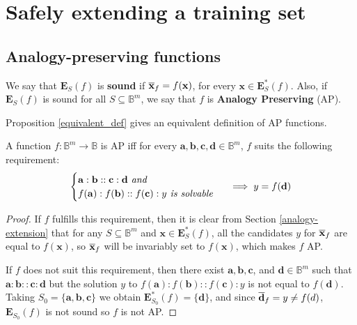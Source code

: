 \section{Safely extending a training set}
\subsection{Analogy-preserving functions}
\label{analogy-preserv}

\begin{definition}
  We say that $\mathbf{E}_S(f)$ is {\bf sound} if
  $\overline{\mathbf{x}}_f=f(\mathbf{x})$, for every $\mathbf{x} \in
  \mathbf{E}^*_S(f)$. Also, if $\mathbf{E}_S(f)$ is sound for all $S \subseteq
  \mathbb{B}^m$, we say that $f$ is {\bf Analogy Preserving} (AP).
\end{definition}

\noindent
Proposition \ref{equivalent_def} gives an equivalent definition of AP
functions.

\begin{proposition}\label{equivalent_def}
  A function $f \colon \mathbb{B}^m \to \mathbb{B}$ is AP iff for every
  $\mathbf{a}, \mathbf{b}, \mathbf{c}, \mathbf{d} \in \mathbb{B}^m$, $f$ suits
  the following requirement:
  $$
  \begin{cases}
    \mathbf{a} :  \mathbf{b} ::  \mathbf{c} :  \mathbf{d} \emph{ and }\\
  f(\mathbf{a}) :  f(\mathbf{b}) ::  f(\mathbf{c}) :  y \emph{ is solvable  }
  \end{cases}
  \implies y = f(\mathbf{d})
  $$
\end{proposition}
\begin{proof}
  If $f$ fulfills  this requirement, then it is clear from Section
  \ref{analogy-extension} that for any $S \subseteq
  \mathbb{B}^m$ and $\mathbf{x} \in \mathbf{E}^*_S(f)$, all the candidates $y$
  for $\overline{\mathbf{x}}_f$ are equal to $f(\mathbf{x})$, so
  $\overline{\mathbf{x}}_f$ will be invariably set to $f(\mathbf{x})$, which makes
  $f$ AP.

If $f$ does not suit this requirement, then there exist $\mathbf{a},
  \mathbf{b}, \mathbf{c}$, and $\mathbf{d} \in \mathbb{B}^m$ such that
  $\mathbf{a} : \mathbf{b} :: \mathbf{c} : \mathbf{d}$ but the solution $y$ to
  $f(\mathbf{a}) : f(\mathbf{b}) :: f(\mathbf{c}) : y$ is not equal to
  $f(\mathbf{d})$. Taking $S_0 = \{\mathbf{a}, \mathbf{b}, \mathbf{c}\}$ we
  obtain $\mathbf{E}^*_{S_0}(f) = \{\mathbf{d}\}$, and since $\overline{\mathbf{d}}_f = y
  \neq f(d)$, $\mathbf{E}_{S_0}(f)$ is not sound so $f$ is not AP.
\end{proof}


